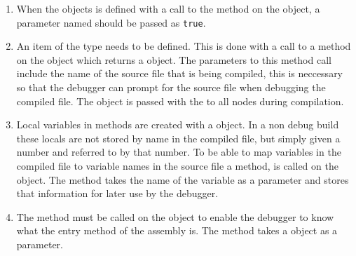  	\begin{enumerate}
 		\item When the  objects is defined with a call to 
 		the  method on the  
 		object, a parameter named  should be passed as 
 		\texttt{true}.
 		
		\item An item of the type  needs to be 
		defined. This is done with a call to a  method on 
		the  object which returns a 
		 object. The parameters to this method call 
		include the name of the source file that is being compiled, this is 
		neccessary so that the debugger can prompt for the source file when 
		debugging the compiled file. The  object is 
		passed with the  to all nodes during compilation.

		\item Local variables in methods are created with a  
		object. In a non debug build these locals are not stored by name in the 
		compiled file, but simply given a number and referred to by that number.
		To be able to map variables in the compiled file to variable names in the
		source file a method,  is called on the 
		 object. The method takes the name of the variable as
		a parameter and stores that information for later use by the debugger.
		
		\item The method  must be called on the 
		 object to enable the debugger to know what the entry
		method of the assembly is. The method takes a  object
		as a parameter.
		

\end{enumerate}
